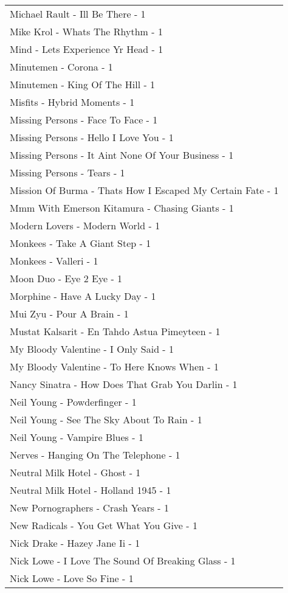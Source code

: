 \documentclass[
]{article}
\begin{document}
\begin{longtable}{l}
Michael Rault - Ill Be There - 1 \\ 
Mike Krol - Whats The Rhythm - 1 \\ 
Mind - Lets Experience Yr Head - 1 \\ 
Minutemen - Corona - 1 \\ 
Minutemen - King Of The Hill - 1 \\ 
Misfits - Hybrid Moments - 1 \\ 
Missing Persons - Face To Face - 1 \\ 
Missing Persons - Hello I Love You - 1 \\ 
Missing Persons - It Aint None Of Your Business - 1 \\ 
Missing Persons - Tears - 1 \\ 
Mission Of Burma - Thats How I Escaped My Certain Fate - 1 \\ 
Mmm With Emerson Kitamura - Chasing Giants - 1 \\ 
Modern Lovers - Modern World - 1 \\ 
Monkees - Take A Giant Step - 1 \\ 
Monkees - Valleri - 1 \\ 
Moon Duo - Eye 2 Eye - 1 \\ 
Morphine - Have A Lucky Day - 1 \\ 
Mui Zyu - Pour A Brain - 1 \\ 
Mustat Kalsarit - En Tahdo Astua Pimeyteen - 1 \\ 
My Bloody Valentine - I Only Said - 1 \\ 
My Bloody Valentine - To Here Knows When - 1 \\ 
Nancy Sinatra - How Does That Grab You Darlin - 1 \\ 
Neil Young - Powderfinger - 1 \\ 
Neil Young - See The Sky About To Rain - 1 \\ 
Neil Young - Vampire Blues - 1 \\ 
Nerves - Hanging On The Telephone - 1 \\ 
Neutral Milk Hotel - Ghost - 1 \\ 
Neutral Milk Hotel - Holland 1945 - 1 \\ 
New Pornographers - Crash Years - 1 \\ 
New Radicals - You Get What You Give - 1 \\ 
Nick Drake - Hazey Jane Ii - 1 \\ 
Nick Lowe - I Love The Sound Of Breaking Glass - 1 \\ 
Nick Lowe - Love So Fine - 1 \\ 

\end{longtable}
\end{document}
